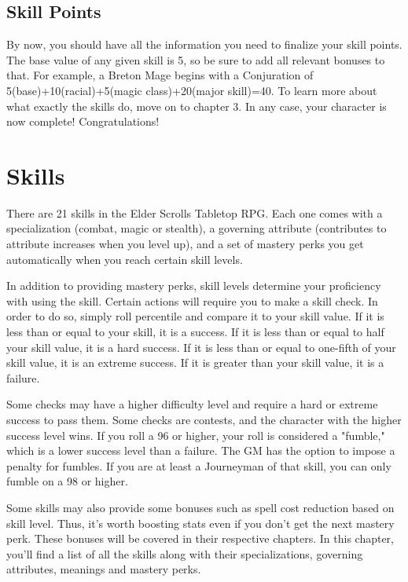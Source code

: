 \documentclass[12pt]{book}
\begin{document}
\section{Skill Points}
By now, you should have all the information you need to finalize your skill points. The base value of any given skill is 5, so be sure to add all relevant bonuses to that. For example, a Breton Mage begins with a Conjuration of 5(base)+10(racial)+5(magic class)+20(major skill)=40. To learn more about what exactly the skills do, move on to chapter 3. In any case, your character is now complete! Congratulations!

\chapter{Skills}

There are 21 skills in the Elder Scrolls Tabletop RPG. Each one comes with a specialization (combat, magic or stealth), a governing attribute (contributes to attribute increases when you level up), and a set of mastery perks you get automatically when you reach certain skill levels.

In addition to providing mastery perks, skill levels determine your proficiency with using the skill. Certain actions will require you to make a skill check. In order to do so, simply roll percentile and compare it to your skill value. If it is less than or equal to your skill, it is a success. If it is less than or equal to half your skill value, it is a hard success. If it is less than or equal to one-fifth of your skill value, it is an extreme success. If it is greater than your skill value, it is a failure.

Some checks may have a higher difficulty level and require a hard or extreme success to pass them. Some checks are contests, and the character with the higher success level wins. If you roll a 96 or higher, your roll is considered a "fumble," which is a lower success level than a failure. The GM has the option to impose a penalty for fumbles. If you are at least a Journeyman of that skill, you can only fumble on a 98 or higher.

Some skills may also provide some bonuses such as spell cost reduction based on skill level. Thus, it's worth boosting stats even if you don't get the next mastery perk. These bonuses will be covered in their respective chapters. In this chapter, you'll find a list of all the skills along with their specializations, governing attributes, meanings and mastery perks.
\end{document}

